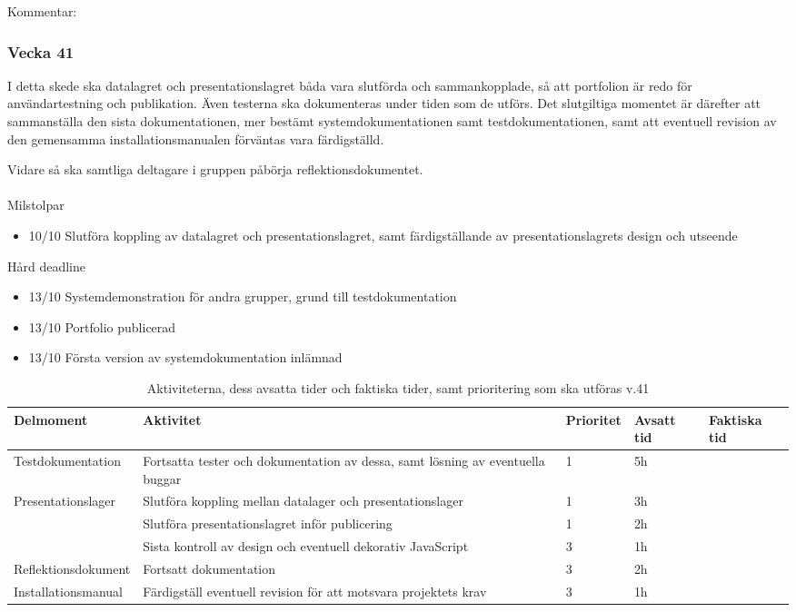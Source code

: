 \documentclass{TDP003mall}
\begin{document}
Kommentar:

\pagebreak

\subsubsection*{Vecka 41}

I detta skede ska datalagret och presentationslagret båda vara slutförda och sammankopplade, så att portfolion är redo för användartestning och publikation. Även testerna ska dokumenteras under tiden som de utförs. Det slutgiltiga momentet är därefter att sammanställa den sista dokumentationen, mer bestämt systemdokumentationen samt testdokumentationen, samt att eventuell revision av den gemensamma installationsmanualen förväntas vara färdigställd.

Vidare så ska samtliga deltagare i gruppen påbörja reflektionsdokumentet.
\\
\\
Milstolpar
\begin{itemize}
\color{blue}
    \item 10/10 Slutföra koppling av datalagret och presentationslagret, samt färdigställande av presentationslagrets design och utseende
\end{itemize}
Hård deadline

\begin{itemize}
\color{red}
    \item 13/10 Systemdemonstration för andra grupper, grund till
testdokumentation
    \item 13/10 Portfolio publicerad
    \item 13/10 Första version av systemdokumentation inlämnad
\end{itemize}

\begin{table}[!h]
\begin{tabularx}{\textwidth}{|l|X|l|l|l|}
  \hline
    Delmoment & Aktivitet & Prioritet & Avsatt tid & Faktiska tid\\ \hline
    Testdokumentation    & Fortsatta tester och dokumentation av dessa, samt lösning av eventuella buggar      & 1   & 5h         &     \\  \hline
    \multirow{3}{*}{Presentationslager}   & Slutföra koppling mellan datalager och presentationslager  & 1   & 3h    &     \\ \cline{2-5}
        & Slutföra presentationslagret inför publicering & 1   & 2h     &     \\ \cline{2-5}
        & Sista kontroll av design och eventuell dekorativ JavaScript & 3   & 1h         &     \\  \hline
    Reflektionsdokument  & Fortsatt dokumentation   & 3 & 2h    &    \\   \hline
    Installationsmanual & Färdigställ eventuell revision för att motsvara projektets krav   & 3 & 1h    &    \\   \hline
\end{tabularx}
\centering
    \caption{\label{tab:table-name}Aktiviteterna, dess avsatta tider och faktiska tider, samt prioritering som ska utföras v.41}
\end{table}
\end{document}
